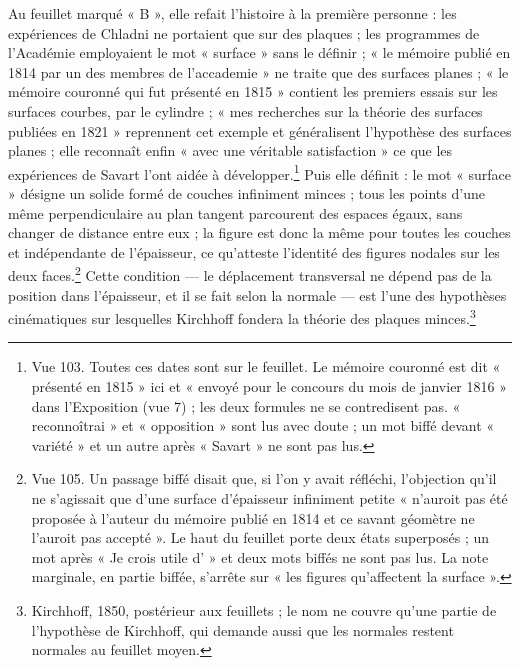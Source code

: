 \documentclass[11pt,a4paper]{article}
\begin{document}
Au feuillet marqué « B », elle refait l'histoire à la première personne : les
expériences de Chladni ne portaient que sur des plaques ; les programmes de
l'Académie employaient le mot « surface » sans le définir ; « le mémoire publié
en 1814 par un des membres de l'accademie » ne traite que des surfaces planes ;
« le mémoire couronné qui fut présenté en 1815 » contient les premiers essais
sur les surfaces courbes, par le cylindre ; « mes recherches sur la théorie des
surfaces publiées en 1821 » reprennent cet exemple et généralisent l'hypothèse
des surfaces planes ; elle reconnaît enfin « avec une véritable satisfaction »
ce que les expériences de Savart l'ont aidée à développer.\footnote{Vue 103.
Toutes ces dates sont sur le feuillet. Le mémoire couronné est dit « présenté en
1815 » ici et « envoyé pour le concours du mois de janvier 1816 » dans
l'Exposition (vue 7) ; les deux formules ne se contredisent pas. « reconnoîtrai »
et « opposition » sont lus avec doute ; un mot biffé devant « variété » et un
autre après « Savart » ne sont pas lus.} Puis elle définit : le mot « surface »
désigne un solide formé de couches infiniment minces ; tous les points d'une
même perpendiculaire au plan tangent parcourent des espaces égaux, sans changer
de distance entre eux ; la figure est donc la même pour toutes les couches et
indépendante de l'épaisseur, ce qu'atteste l'identité des figures nodales sur
les deux faces.\footnote{Vue 105. Un passage biffé disait que, si l'on y avait
réfléchi, l'objection qu'il ne s'agissait que d'une surface d'épaisseur
infiniment petite « n'auroit pas été proposée à l'auteur du mémoire publié en
1814 et ce savant géomètre ne l'auroit pas accepté ». Le haut du feuillet porte
deux états superposés ; un mot après « Je crois utile d' » et deux mots biffés
ne sont pas lus. La note marginale, en partie biffée, s'arrête sur « les figures
qu'affectent la surface ».} Cette condition — le déplacement transversal ne
dépend pas de la position dans l'épaisseur, et il se fait selon la normale — est
l'une des hypothèses cinématiques sur lesquelles Kirchhoff fondera la théorie des
plaques minces.\footnote{Kirchhoff, 1850, postérieur aux feuillets ; le nom ne
couvre qu'une partie de l'hypothèse de Kirchhoff, qui demande aussi que les
normales restent normales au feuillet moyen.}
\end{document}
